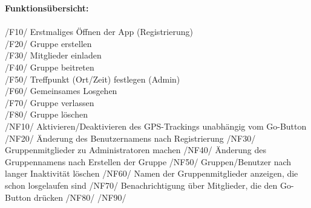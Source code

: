 \textbf{Funktionsübersicht:} \\
\\
/F10/ Erstmaliges Öffnen der App (Registrierung) \\
/F20/ Gruppe erstellen \\
/F30/ Mitglieder einladen \\
/F40/ Gruppe beitreten \\
/F50/ Treffpunkt (Ort/Zeit) festlegen (Admin) \\
/F60/ Gemeinsames Losgehen \\
/F70/ Gruppe verlassen \\
/F80/ Gruppe löschen \\

/NF10/ Aktivieren/Deaktivieren des GPS-Trackings unabhängig vom Go-Button
/NF20/ Änderung des Benutzernamens nach Registrierung
/NF30/ Gruppenmitglieder zu Administratoren machen
/NF40/ Änderung des Gruppennamens nach Erstellen der Gruppe
/NF50/ Gruppen/Benutzer nach langer Inaktivität löschen
/NF60/ Namen der Gruppenmitglieder anzeigen, die schon losgelaufen sind
/NF70/ Benachrichtigung über Mitglieder, die den Go-Button drücken
/NF80/
/NF90/

\newpage

\newpage

\newpage

\newpage

\newpage

\newpage

\newpage

\newpage

\newpage

